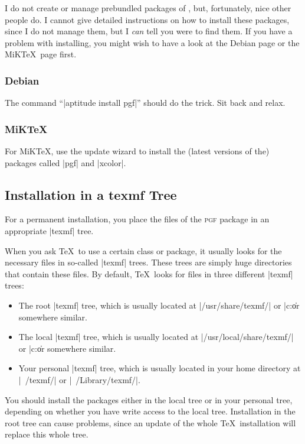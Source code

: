 I do not create or manage prebundled packages of \pgfname, but, fortunately,
nice other people do. I cannot give detailed instructions on how to install
these packages, since I do not manage them, but I \emph{can} tell you were to
find them. If you have a problem with installing, you might wish to have a look
at the Debian page or the MiK\TeX\ page first.


\subsubsection{Debian}

The command ``|aptitude install pgf|'' should do the trick. Sit back and relax.


\subsubsection{MiKTeX}

For MiK\TeX, use the update wizard to install the (latest versions of the)
packages called |pgf| and |xcolor|.


\subsection{Installation in a texmf Tree}

For a permanent installation, you place the files of the \textsc{pgf} package
in an appropriate |texmf| tree.

When you ask \TeX\ to use a certain class or package, it usually looks for the
necessary files in so-called |texmf| trees. These trees are simply huge
directories that contain these files. By default, \TeX\ looks for files in
three different |texmf| trees:
%
\begin{itemize}
    \item The root |texmf| tree, which is usually located at
        |/usr/share/texmf/| or |c:\texmf\| or somewhere similar.
    \item The local  |texmf| tree, which is usually located at
        |/usr/local/share/texmf/| or |c:\localtexmf\| or somewhere similar.
    \item Your personal  |texmf| tree, which is usually located in your home
        directory at |~/texmf/| or |~/Library/texmf/|.
\end{itemize}

You should install the packages either in the local tree or in your personal
tree, depending on whether you have write access to the local tree.
Installation in the root tree can cause problems, since an update of the whole
\TeX\ installation will replace this whole tree.


